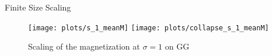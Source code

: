 \documentclass{beamer}
\begin{document}
        \begin{frame}{Finite Size Scaling}
            \begin{figure}[htbp]
                \centering
                \subfigure
                {
                    \label{sfig:gettingCrit:s_1_meanM}
                    \texttt{[image: plots/s\_1\_meanM]}
                }
                \subfigure
                {
                    \label{sfig:gettingCrit:collapse_s_1_meanM}
                    \texttt{[image: plots/collapse\_s\_1\_meanM]}
                }
                \caption
                {
                    Scaling of the magnetization at \(\sigma = 1\) on GG
                }
                \label{fig:gettingCrit}
            \end{figure}
        \end{frame}
\end{document}

